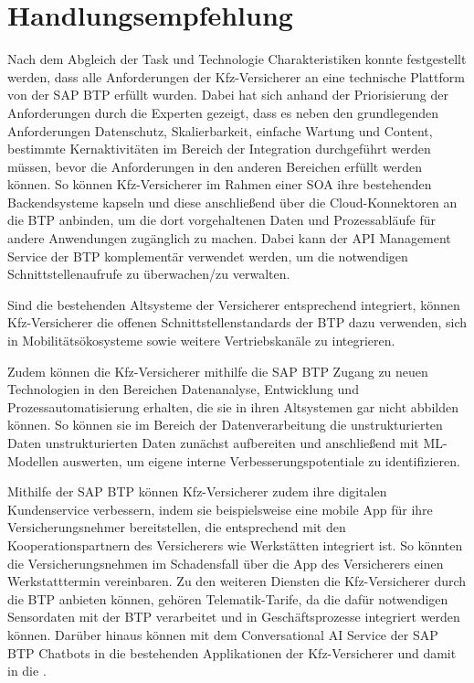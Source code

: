 \chapter{Handlungsempfehlung}

Nach dem Abgleich der Task und Technologie Charakteristiken konnte festgestellt werden, dass alle Anforderungen der Kfz-Versicherer an eine technische Plattform von der SAP BTP erfüllt wurden. Dabei hat sich anhand der Priorisierung der Anforderungen durch die Experten gezeigt, dass es neben den grundlegenden Anforderungen Datenschutz, Skalierbarkeit, einfache Wartung und Content, bestimmte Kernaktivitäten im Bereich der Integration durchgeführt werden müssen, bevor die Anforderungen in den anderen Bereichen erfüllt werden können. So können Kfz-Versicherer im Rahmen einer SOA ihre bestehenden Backendsysteme kapseln und diese anschließend über die Cloud-Konnektoren an die BTP anbinden, um die dort vorgehaltenen Daten und Prozessabläufe für andere Anwendungen zugänglich zu machen. Dabei kann der API Management Service der BTP komplementär verwendet werden, um die notwendigen Schnittstellenaufrufe zu überwachen/zu verwalten. 

Sind die bestehenden Altsysteme der Versicherer entsprechend integriert, können Kfz-Versicherer die offenen Schnittstellenstandards der BTP dazu verwenden, sich in Mobilitätsökosysteme sowie weitere Vertriebskanäle zu integrieren.

Zudem können die Kfz-Versicherer mithilfe die SAP BTP Zugang zu neuen Technologien in den Bereichen Datenanalyse, Entwicklung und Prozessautomatisierung erhalten, die sie in ihren Altsystemen gar nicht abbilden können. So können sie im Bereich der Datenverarbeitung die unstrukturierten Daten unstrukturierten Daten zunächst aufbereiten und anschließend mit ML-Modellen auswerten, um eigene interne Verbesserungspotentiale zu identifizieren.

Mithilfe der SAP BTP können Kfz-Versicherer zudem ihre digitalen Kundenservice verbessern, indem sie beispielsweise eine mobile App für ihre Versicherungsnehmer bereitstellen, die entsprechend mit den Kooperationspartnern des Versicherers wie Werkstätten integriert ist. So könnten die Versicherungsnehmen im Schadensfall über die App des Versicherers einen Werkstatttermin vereinbaren. Zu den weiteren Diensten die Kfz-Versicherer durch die BTP anbieten können, gehören Telematik-Tarife, da die dafür notwendigen Sensordaten mit der BTP verarbeitet und in Geschäftsprozesse integriert werden können. Darüber hinaus können mit dem Conversational AI Service der SAP BTP Chatbots in die bestehenden Applikationen der Kfz-Versicherer und damit in die .

